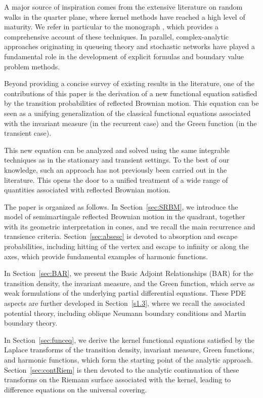 \documentclass[11pt]{article}
\theoremstyle{definition}
\begin{document}
A major source of inspiration comes from the extensive literature on random walks in the quarter plane, where kernel methods have reached a high level of maturity. We refer in particular to the monograph \cite{fayolle_random_2017}, which provides a comprehensive account of these techniques. In parallel, complex-analytic approaches originating in queueing theory and stochastic networks \cite{foddy_analysis_1984,baccelli_analysis_1987} have played a fundamental role in the development of explicit formulas and boundary value problem methods.

Beyond providing a concise survey of existing results in the literature, one of the contributions of this paper is the derivation of a new functional equation satisfied by the transition probabilities of reflected Brownian motion. This equation can be seen as a unifying generalization of the classical functional equations associated with the invariant measure (in the recurrent case) and the Green function (in the transient case). 

This new equation can be analyzed and solved using the same integrable techniques as in the stationary and transient settings. To the best of our knowledge, such an approach has not previously been carried out in the literature. This opens the door to a unified treatment of a wide range of quantities associated with reflected Brownian motion.

\medskip


The paper is organized as follows. 
In Section~\ref{sec:SRBM}, we introduce the model of semimartingale reflected Brownian motion in the quadrant, together with its geometric interpretation in cones, and we recall the main recurrence and transience criteria. 
Section~\ref{sec:absesc} is devoted to absorption and escape probabilities, including hitting of the vertex and escape to infinity or along the axes, which provide fundamental examples of harmonic functions. 

In Section~\ref{sec:BAR}, we present the Basic Adjoint Relationships (BAR) for the transition density, the invariant measure, and the Green function, which serve as weak formulations of the underlying partial differential equations. 
These PDE aspects are further developed in Section~\ref{s1.3}, where we recall the associated potential theory, including oblique Neumann boundary conditions and Martin boundary theory.

In Section~\ref{sec:funceq}, we derive the kernel functional equations satisfied by the Laplace transforms of the transition density, invariant measure, Green functions, and harmonic functions, which form the starting point of the analytic approach. 
Section~\ref{sec:contRiem} is then devoted to the analytic continuation of these transforms on the Riemann surface associated with the kernel, leading to difference equations on the universal covering.
\end{document}
